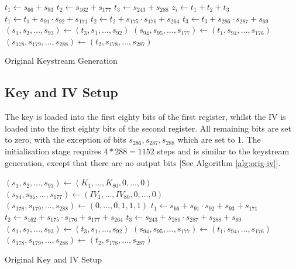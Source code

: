 \documentclass[conference]{IEEEtran}
\begin{document}
\begin{algorithm}[H]
\begin{algorithmic}[1]
 
\State $t_1 \gets s_{66} + s_{93}$
\State $t_2 \gets s_{162} + s_{177}$
\State $t_3 \gets s_{243} + s_{288}$
\State
\State $z_i \gets t_1 + t_2 + t_3$
\State
\State $t_1 \gets t_1 + s_{91} \cdot s_{92} + s_{171}$
\State $t_2 \gets t_2 + s_{175} \cdot s_{176} + s_{264}$
\State $t_3 \gets t_3 + s_{286} \cdot s_{287} + s_{69}$
\State
\State $(s_1,s_2,\dots,s_{93}) \gets (t_3,s_1,\dots,s_{92})$
\State $(s_{94},s_{95},\dots,s_{177}) \gets (t_1,s_{94},\dots,s_{176})$
\State $(s_{178},s_{179},\dots,s_{288}) \gets (t_2,s_{178},\dots,s_{287})$
\EndFor
\end{algorithmic}
\caption{Original Keystream Generation}\label{alg:orig}
\end{algorithm}

\subsection{Key and IV Setup}\label{sec:key-iv-o}
The key is loaded into the first eighty bits of the first register, whilst the IV is loaded into the first eighty bits of the second register. All remaining bits are set to zero, with the exception of bits $s_{286},s_{287},s_{288}$ which are set to 1. The initialisation stage requires $4*288=1152$ steps and is similar to the keystream generation, except that there are no output bits [See Algorithm \ref{alg:orig-iv}].

\begin{algorithm}[H]
\begin{algorithmic}[1]
\State $(s_1,s_2,\dots,s_{93}) \gets (K_1,\dots,K_{80},0,\dots,0)$
\State $(s_{94},s_{95},\dots,s_{177}) \gets (IV_1,\dots,IV_{80},0,\dots,0)$
\State $(s_{178},s_{179},\dots,s_{288}) \gets (0,\dots,0,1,1,1)$
\State
{}
\State $t_1 \gets s_{66} + s_{91} \cdot s_{92} + s_{93} + s_{171}$
\State $t_2 \gets s_{162} + s_{175} \cdot s_{176} + s_{177} + s_{264}$
\State $t_3 \gets s_{243} + s_{286} \cdot s_{287} + s_{288}+ s_{69}$
\State
\State $(s_1,s_2,\dots,s_{93}) \gets (t_3,s_1,\dots,s_{92})$
\State $(s_{94},s_{95},\dots,s_{177}) \gets (t_1,s_{94},\dots,s_{176})$
\State $(s_{178},s_{179},\dots,s_{288}) \gets (t_2,s_{178},\dots,s_{287})$
\EndFor
\end{algorithmic}
\caption{Original Key and IV Setup}\label{alg:orig-iv}
\end{algorithm}
\end{document}
